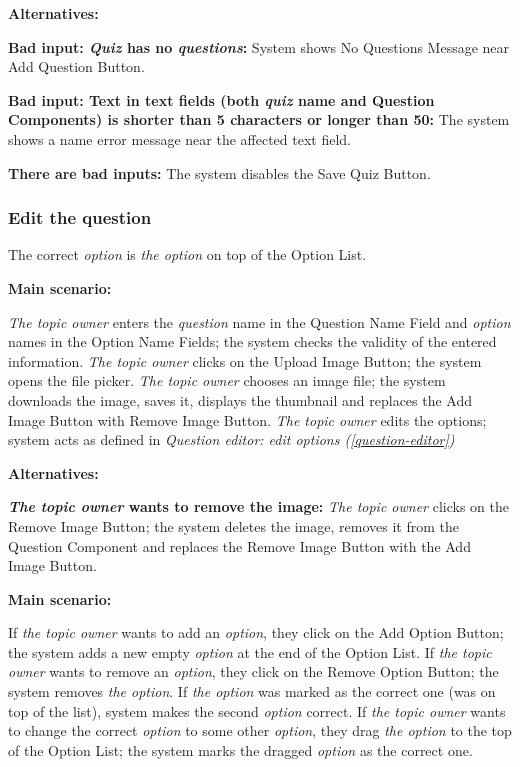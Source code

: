 \documentclass[
    english, %
]{VUMIFPSkursinis}
\begin{document}
\noindent\textbf{\fontsize{13}{15}\selectfont Alternatives:}

\textbf{Bad input: \textit{Quiz} has no \textit{questions}:} System shows No Questions Message near Add Question Button.

\textbf{Bad input: Text in text fields (both \textit{quiz} name and Question Components) is shorter than 5 characters or longer than 50:} The system shows a name error message near the affected text field.

\textbf{There are bad inputs:} The system disables the Save Quiz Button.

\subsubsection{Edit the question}

The correct \textit{option} is \textit{the option} on top of the Option List.

\noindent\textbf{\fontsize{13}{15}\selectfont Main scenario:}

\textit{The topic owner} enters the \textit{question} name in the Question Name Field and \textit{option} names in the Option Name Fields; the system checks the validity of the entered information. \textit{The topic owner} clicks on the Upload Image Button; the system opens the file picker. \textit{The topic owner} chooses an image file; the system downloads the image, saves it, displays the thumbnail and replaces the Add Image Button with Remove Image Button. \textit{The topic owner} edits the options; system acts as defined in \textit{Question editor: edit options (\ref{question-editor})}

\noindent\textbf{\fontsize{13}{15}\selectfont Alternatives:}

\textbf{\textit{The topic owner} wants to remove the image:} \textit{The topic owner} clicks on the Remove Image Button; the system deletes the image, removes it from the Question Component and replaces the Remove Image Button with the Add Image Button.

 \label{question-editor}

\noindent\textbf{\fontsize{13}{15}\selectfont Main scenario:}

If \textit{the topic owner} wants to add an \textit{option}, they click on the Add Option Button; the system adds a new empty \textit{option} at the end of the Option List. If \textit{the topic owner} wants to remove an \textit{option}, they click on the Remove Option Button; the system removes \textit{the option}. If \textit{the option} was marked as the correct one (was on top of the list), system makes the second \textit{option} correct. If \textit{the topic owner} wants to change the correct \textit{option} to some other \textit{option}, they drag \textit{the option} to the top of the Option List; the system marks the dragged \textit{option} as the correct one.
\end{document}

